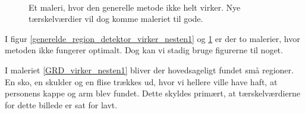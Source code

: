 \begin{figure}[!h]
    \centering
    \\
	\hspace{1em}
     \caption[]{Et maleri, hvor den generelle metode ikke helt virker.
	 Nye tærskelværdier vil dog komme maleriet til gode.}
     \label{generelde_region_detektor_virker_nesten2}
\end{figure}

I figur \ref{generelde_region_detektor_virker_nesten1} og \ref{generelde_region_detektor_virker_nesten2} er der to
malerier, hvor metoden ikke fungerer optimalt. Dog kan
vi stadig bruge figurerne til noget.

I maleriet \ref{GRD_virker_nesten1} bliver der hovedsageligt fundet små
regioner. En sko, en skulder og en flise trækkes ud, hvor vi hellere
ville have haft, at personens kappe og arm blev fundet. Dette skyldes
primært, at tærskelværdierne for dette billede er sat for lavt. 


